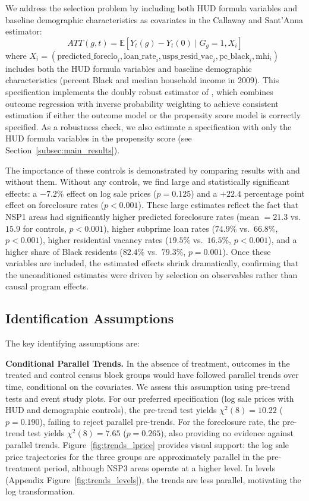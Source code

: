 \documentclass[12pt,authoryear]{elsarticle}
\begin{document}
We address the selection problem by including both HUD formula variables and baseline demographic characteristics as covariates in the Callaway and Sant'Anna estimator:
\begin{equation}
ATT(g,t) = \mathbb{E}\left[Y_t(g) - Y_t(0) \mid G_g = 1, X_i\right]
\label{eq:att_controls}
\end{equation}
where $X_i = (\text{predicted\_foreclo}_i, \text{loan\_rate}_i, \text{usps\_resid\_vac}_i, \text{pc\_black}_i, \text{mhi}_i)$ includes both the HUD formula variables and baseline demographic characteristics (percent Black and median household income in 2009). This specification implements the doubly robust estimator of \citet{callaway2021}, which combines outcome regression with inverse probability weighting to achieve consistent estimation if either the outcome model or the propensity score model is correctly specified. As a robustness check, we also estimate a specification with only the HUD formula variables in the propensity score (see Section~\ref{subsec:main_results}).

The importance of these controls is demonstrated by comparing results with and without them. Without any controls, we find large and statistically significant effects: a $-7.2\%$ effect on log sale prices ($p = 0.125$) and a $+22.4$ percentage point effect on foreclosure rates ($p < 0.001$). These large estimates reflect the fact that NSP1 areas had significantly higher predicted foreclosure rates (mean $= 21.3$ vs.~$15.9$ for controls, $p < 0.001$), higher subprime loan rates ($74.9\%$ vs.~$66.8\%$, $p < 0.001$), higher residential vacancy rates ($19.5\%$ vs.~$16.5\%$, $p < 0.001$), and a higher share of Black residents ($82.4\%$ vs.~$79.3\%$, $p = 0.001$). Once these variables are included, the estimated effects shrink dramatically, confirming that the unconditioned estimates were driven by selection on observables rather than causal program effects.

\subsection{Identification Assumptions}

The key identifying assumptions are:

\textbf{Conditional Parallel Trends.} In the absence of treatment, outcomes in the treated and control census block groups would have followed parallel trends over time, conditional on the covariates. We assess this assumption using pre-trend tests and event study plots. For our preferred specification (log sale prices with HUD and demographic controls), the pre-trend test yields $\chi^2(8) = 10.22$ ($p = 0.190$), failing to reject parallel pre-trends. For the foreclosure rate, the pre-trend test yields $\chi^2(8) = 7.65$ ($p = 0.265$), also providing no evidence against parallel trends. Figure~\ref{fig:trends_lprice} provides visual support: the log sale price trajectories for the three groups are approximately parallel in the pre-treatment period, although NSP3 areas operate at a higher level. In levels (Appendix Figure~\ref{fig:trends_levels}), the trends are less parallel, motivating the log transformation.
\end{document}
